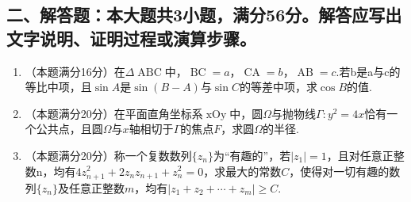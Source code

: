 \documentclass[UTF8]{ctexart}\usepackage{amsmath,amssymb,graphicx}
\newcommand{\tmop}[1]{\ensuremath{\operatorname{#1}}}
\begin{document}
\subsection*{二、解答题：本大题共3小题，满分56分。解答应写出文字说明、证明过程或演算步骤。}

\begin{enumerate}
  \item （本题满分16分）在$\Delta \tmop{ABC}$中，$\tmop{BC} =
  a$，$\tmop{CA} = b$，$\tmop{AB} =
  c$.若b是a与c的等比中项，且$\sin A$是$\sin (B - A)$与$\sin
  C$的等差中项，求$\cos B$的值.
  
  \item
  （本题满分20分）在平面直角坐标系$\tmop{xOy}$中，圆$\Omega$与抛物线$\Gamma
  : y^2 = 4
  x$恰有一个公共点，且圆$\Omega$与$x$轴相切于$\Gamma$的焦点$F$，求圆$\Omega$的半径.
  
  \item （本题满分20分）称一个复数数列$\{ z_n
  \}$为``有趣的''，若$| z_1 | = 1$，且对任意正整数n，均有$4
  z_{n + 1}^2 + 2 z_n z_{n + 1} + z_n^2 =
  0$，求最大的常数$C$，使得对一切有趣的数列$\{ z_n
  \}$及任意正整数$m$，均有$| z_1 + z_2 + \cdots + z_m | \geqslant C$.
\end{enumerate}
\end{document}
